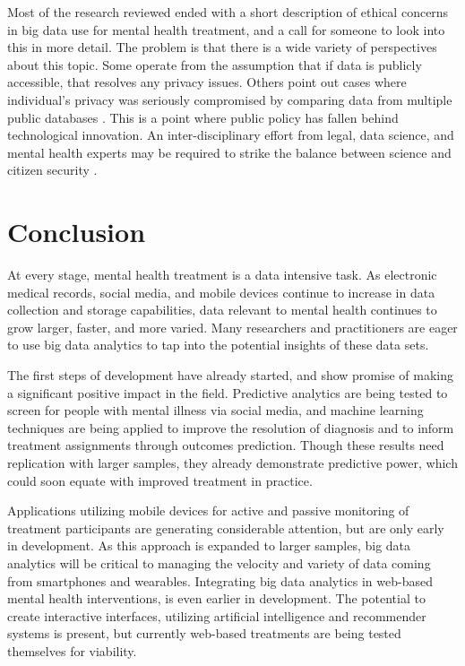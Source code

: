 \documentclass[sigconf]{acmart}
\begin{document}
Most of the research reviewed ended with a short description of ethical concerns in big data use for mental health treatment, and a call for someone to look into this in more detail. The problem is that there is a wide variety of perspectives about this topic. Some operate from the assumption that if data is publicly accessible, that resolves any privacy issues. Others point out cases where individual's privacy was seriously compromised by comparing data from multiple public databases \cite{ethicsdivide}. This is a point where public policy has fallen behind technological innovation. An inter-disciplinary effort from legal, data science, and mental health experts may be required to strike the balance between science and citizen security \cite{datalaw}.

\section{Conclusion}

At every stage, mental health treatment is a data intensive task. As electronic medical records, social media, and mobile devices continue to increase in data collection and storage capabilities, data relevant to mental health continues to grow larger, faster, and more varied. Many researchers and practitioners are eager to use big data analytics to tap into the potential insights of these data sets.

The first steps of development have already started, and show promise of making a significant positive impact in the field. Predictive analytics are being tested to screen for people with mental illness via social media, and machine learning techniques are being applied to improve the resolution of diagnosis and to inform treatment assignments through outcomes prediction. Though these results need replication with larger samples, they already demonstrate predictive power, which could soon equate with improved treatment in practice.

Applications utilizing mobile devices for active and passive monitoring of treatment participants are generating considerable attention, but are only early in development. As this approach is expanded to larger samples, big data analytics will be critical to managing the velocity and variety of data coming from smartphones and wearables. Integrating big data analytics in web-based mental health interventions, is even earlier in development. The potential to create interactive interfaces, utilizing artificial intelligence and recommender systems is present, but currently web-based treatments are being tested themselves for viability.
\end{document}
